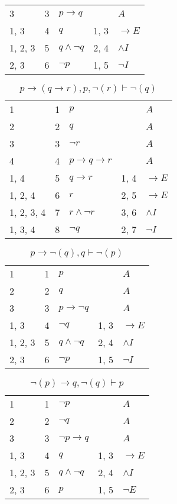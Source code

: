 \documentclass{article}
\begin{document}
\begin{table}[htbp]
\begin{tabular}{lrlll}
{3} & 3 & $p→q$ & {} & $A$ \\
{1, 3} & 4 & $q$ & {1, 3} & $→E$ \\
{1, 2, 3} & 5 & $q∧ ¬q$ & {2, 4} & $∧I$ \\
{2, 3} & 6 & $¬p$ & {1, 5} & $¬I$ \\
\end{tabular}
\end{table}\begin{table}[htbp]\caption*{$p→(q→r),p,¬(r) ⊢ ¬(q)$}\centering\begin{tabular}{lrlll}
{1} & 1 & $p$ & {} & $A$ \\
{2} & 2 & $q$ & {} & $A$ \\
{3} & 3 & $¬r$ & {} & $A$ \\
{4} & 4 & $p→q→r$ & {} & $A$ \\
{1, 4} & 5 & $q→r$ & {1, 4} & $→E$ \\
{1, 2, 4} & 6 & $r$ & {2, 5} & $→E$ \\
{1, 2, 3, 4} & 7 & $r∧ ¬r$ & {3, 6} & $∧I$ \\
{1, 3, 4} & 8 & $¬q$ & {2, 7} & $¬I$ \\
\end{tabular}
\end{table}\begin{table}[htbp]\caption*{$p→ ¬(q),q ⊢ ¬(p)$}\centering\begin{tabular}{lrlll}
{1} & 1 & $p$ & {} & $A$ \\
{2} & 2 & $q$ & {} & $A$ \\
{3} & 3 & $p→ ¬q$ & {} & $A$ \\
{1, 3} & 4 & $¬q$ & {1, 3} & $→E$ \\
{1, 2, 3} & 5 & $q∧ ¬q$ & {2, 4} & $∧I$ \\
{2, 3} & 6 & $¬p$ & {1, 5} & $¬I$ \\
\end{tabular}
\end{table}\begin{table}[htbp]\caption*{$¬(p)→q,¬(q) ⊢ p$}\centering\begin{tabular}{lrlll}
{1} & 1 & $¬p$ & {} & $A$ \\
{2} & 2 & $¬q$ & {} & $A$ \\
{3} & 3 & $¬p→q$ & {} & $A$ \\
{1, 3} & 4 & $q$ & {1, 3} & $→E$ \\
{1, 2, 3} & 5 & $q∧ ¬q$ & {2, 4} & $∧I$ \\
{2, 3} & 6 & $p$ & {1, 5} & $¬E$ \\
\end{tabular}

\end{table}
\end{document}
